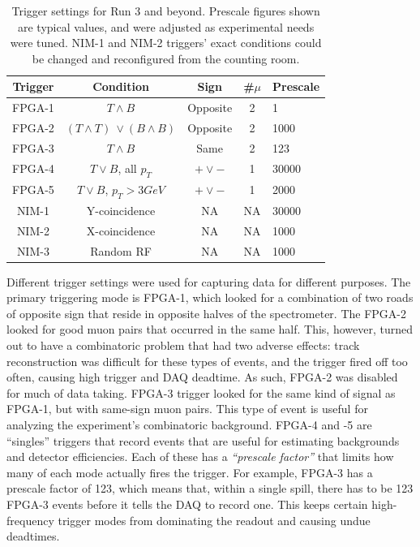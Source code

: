 \begin{table}[bthp]\centering
  \begin{tabular}{c|cccl}
    \hline
    Trigger & Condition       & Sign    & \#$\mu$ & Prescale\\
    \hline
    FPGA-1   & $T \land B$    					& Opposite  & 2		& 1    \\
    FPGA-2   & $(T \land T)\ \lor (B \land B)$  & Opposite  & 2		& 1000 \\
    FPGA-3   & $T \land B$						& Same		& 2		& 123  \\
    FPGA-4   & $T \lor B$, all $p_T$	        & $+ \lor -$& 1		& 30000\\
    FPGA-5   & $T \lor B$, $p_T > 3GeV$			& $+ \lor -$& 1		& 2000 \\
    NIM-1    & Y-coincidence 					& NA		& NA	& 30000\\
    NIM-2    & X-coincidence					& NA		& NA	& 1000 \\
    NIM-3	 & Random RF						& NA		& NA	& 1000 \\
    \hline
  \end{tabular}
    \caption{Trigger settings for Run 3 and beyond. Prescale figures shown are typical values, and were adjusted as experimental needs were tuned. NIM-1 and NIM-2 triggers' exact conditions could be changed and reconfigured from the counting room.}
    \label{tab:trigger-settings}
\end{table}

Different trigger settings were used for capturing data for different purposes. The primary triggering mode is FPGA-1, which looked for a combination of two roads of opposite sign that reside in opposite halves of the spectrometer. The FPGA-2 looked for good muon pairs that occurred in the same half. This, however, turned out to have a combinatoric problem that had two adverse effects: track reconstruction was difficult for these types of events, and the trigger fired off too often, causing high trigger and DAQ deadtime. As such, FPGA-2 was disabled for much of data taking. FPGA-3 trigger looked for the same kind of signal as FPGA-1, but with same-sign muon pairs. This type of event is useful for analyzing the experiment's combinatoric background. FPGA-4 and -5 are ``singles'' triggers that record events that are useful for estimating backgrounds and detector efficiencies. Each of these has a \emph{``prescale factor''} that limits how many of each mode actually fires the trigger. For example, FPGA-3 has a prescale factor of 123, which means that, within a single spill, there has to be 123 FPGA-3 events before it tells the DAQ to record one. This keeps certain high-frequency trigger modes from dominating the readout and causing undue deadtimes.

